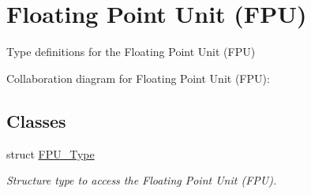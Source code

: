 \hypertarget{group___c_m_s_i_s___f_p_u}{}\section{Floating Point Unit (F\+PU)}
\label{group___c_m_s_i_s___f_p_u}


Type definitions for the Floating Point Unit (F\+PU)  


Collaboration diagram for Floating Point Unit (F\+PU)\+:
\subsection*{Classes}
\begin{DoxyCompactItemize}
\item 
struct \hyperlink{struct_f_p_u___type}{F\+P\+U\+\_\+\+Type}
\begin{DoxyCompactList}\small\item\em Structure type to access the Floating Point Unit (F\+PU). \end{DoxyCompactList}\end{DoxyCompactItemize}
